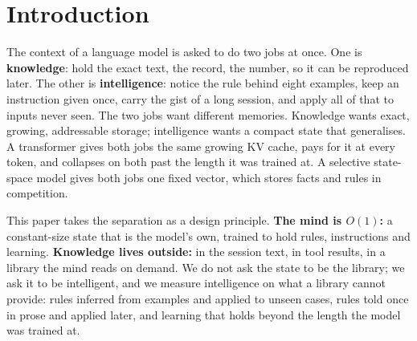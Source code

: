 \documentclass[11pt]{article}
\begin{document}
\section{Introduction}
\label{sec:intro}

The context of a language model is asked to do two jobs at once. One is \textbf{knowledge}: hold the exact text, the record, the number, so it can be reproduced later. The other is \textbf{intelligence}: notice the rule behind eight examples, keep an instruction given once, carry the gist of a long session, and apply all of that to inputs never seen. The two jobs want different memories. Knowledge wants exact, growing, addressable storage; intelligence wants a compact state that generalises. A transformer \citep{vaswani2017attention} gives both jobs the same growing KV cache, pays for it at every token, and collapses on both past the length it was trained at. A selective state-space model \citep{gu2023mamba,dao2024mamba2} gives both jobs one fixed vector, which stores facts and rules in competition.

This paper takes the separation as a design principle. \textbf{The mind is $O(1)$:} a constant-size state that is the model's own, trained to hold rules, instructions and learning. \textbf{Knowledge lives outside:} in the session text, in tool results, in a library the mind reads on demand. We do not ask the state to be the library; we ask it to be intelligent, and we measure intelligence on what a library cannot provide: rules inferred from examples and applied to unseen cases, rules told once in prose and applied later, and learning that holds beyond the length the model was trained at.
\end{document}
